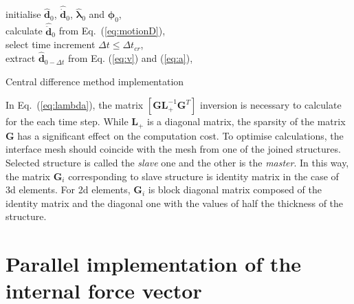 \documentclass[11pt,a4paper,final]{report}
\theoremstyle{plain}
\begin{document}
\begin{algorithm}[H]
	\SetAlgoLined
	initialise  \(\widehat{\textbf{d}}_0\), \(\widehat{\dot{\textbf{d}}}_0\), \(\widehat{\boldsymbol{\lambda}}_0\) and \(\boldsymbol{\phi}_{0}\),\\
	calculate \(\widehat{\ddot{\textbf{d}}}_0\) from Eq.~(\ref{eq:motionD}),\\
	select time increment \(\Delta t\leq\Delta t_{cr}\),\\
	extract \(\widehat{\textbf{d}}_{0-\Delta t}\) from Eq. (\ref{eq:v}) and (\ref{eq:a}),\\
	\caption{Central difference method implementation}
	\label{alg:cdm}
\end{algorithm}

In Eq.~(\ref{eq:lambda}), the matrix \(\left [\textbf{GL}_+^{-1}\textbf{G}^T\right ]\) inversion is necessary to calculate for the each time step.
While \(\textbf{L}_+\) is a diagonal matrix, the sparsity of the matrix \(\textbf{G}\) has a significant effect on the computation cost.
To optimise calculations, the interface mesh should coincide with the mesh from one of the joined structures.
Selected structure is called the \textit{slave} one and the other is the \textit{master}.
In this way, the matrix \(\mathbf{G}_i\) corresponding to slave structure is identity matrix in the case of \ac{3d} elements.
For \ac{2d} elements, \(\mathbf{G}_i\) is block diagonal matrix composed of the identity matrix and the diagonal one with the values of half the thickness of the structure.
 \section{Parallel implementation of the internal force vector}
\label{sec:gpu}
\end{document}
